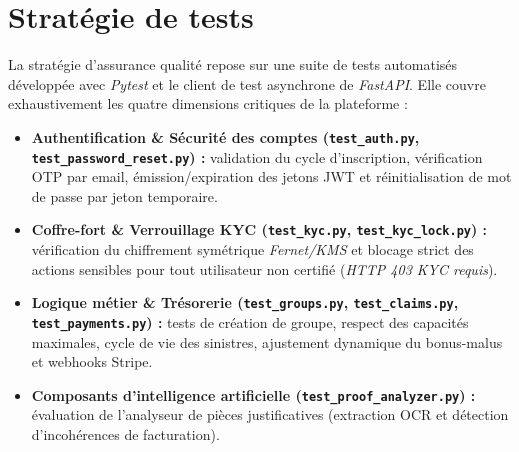 \documentclass[12pt,a4paper]{report}
\begin{document}
\section{Stratégie de tests}
La stratégie d'assurance qualité repose sur une suite de tests automatisés développée avec \textit{Pytest} et le client de test asynchrone de \textit{FastAPI}. Elle couvre exhaustivement les quatre dimensions critiques de la plateforme :
\begin{itemize}
    \item \textbf{Authentification \& Sécurité des comptes (\texttt{test\_auth.py}, \texttt{test\_password\_reset.py}) :} validation du cycle d'inscription, vérification OTP par email, émission/expiration des jetons JWT et réinitialisation de mot de passe par jeton temporaire.
    \item \textbf{Coffre-fort \& Verrouillage KYC (\texttt{test\_kyc.py}, \texttt{test\_kyc\_lock.py}) :} vérification du chiffrement symétrique \textit{Fernet/KMS} et blocage strict des actions sensibles pour tout utilisateur non certifié (\textit{HTTP 403 KYC requis}).
    \item \textbf{Logique métier \& Trésorerie (\texttt{test\_groups.py}, \texttt{test\_claims.py}, \texttt{test\_payments.py}) :} tests de création de groupe, respect des capacités maximales, cycle de vie des sinistres, ajustement dynamique du bonus-malus et webhooks Stripe.
    \item \textbf{Composants d'intelligence artificielle (\texttt{test\_proof\_analyzer.py}) :} évaluation de l'analyseur de pièces justificatives (extraction OCR et détection d'incohérences de facturation).
\end{itemize}
\end{document}
